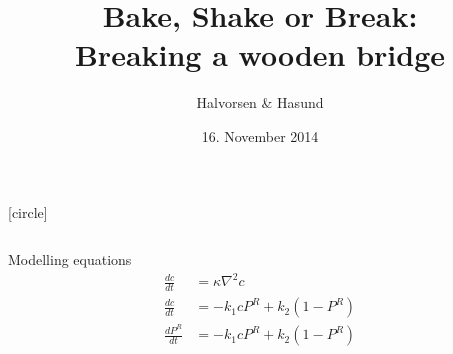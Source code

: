 \documentclass[screen]{beamer}
\title[The Finite Element Method]%
{Bake, Shake or Break: \\Breaking a wooden bridge}
\author[Halvorsen \& Hasund]{Halvorsen \& Hasund}
\institute[NTNU]{The Finite Element Method project}
\date{16. November 2014}
\begin{document}
[circle]

\ntnutitlepage



\begin{frame}
\begin{columns}
    \begin{column}{\linewidth}
      \begin{block}{Modelling equations}
         \begin{align*}
         \frac{dc}{dt} &= \kappa \nabla^2 c \\
           \frac{dc}{dt} &= -k_1 c P^R + k_2 (1-P^R) \\
           \frac{dP^R}{dt} &=  -k_1 c P^R + k_2 (1-P^R)
         \end{align*}
      \end{block}
    \end{column}
  \end{columns}
\end{frame}
\end{document}
